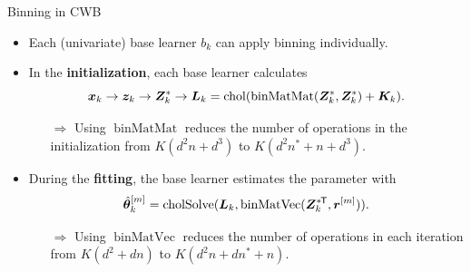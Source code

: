 \documentclass[t,10pt]{beamer}
\newcommand{\todo}{{\color{red}\textbf{TODO:}}\hspace{0.1cm}}
\newcommand{\penMat}{\bm{K}}
\begin{document}

\begin{frame}{Binning in CWB}
  \begin{itemize}
      \item 
        Each (univariate) base learner $b_k$ can apply binning individually.
      
      \item 
        In the \textbf{initialization}, each base learner calculates \[\xv_k \rightarrow \bm{z}_k \rightarrow \bm{Z}_k^\ast \rightarrow \bm{L}_k = \operatorname{chol}(\operatorname{binMatMat}(\design^{\ast}_k, \design^\ast_k) + \penMat_k).\]\vspace{-0.5cm}
        \begin{itemize}
            \item[$\Rightarrow$] Using $\operatorname{binMatMat}$ reduces the number of operations in the initialization from $K(d^2n + d^3)$ to $K(d^2n^\ast + n + d^3)$. 
        \end{itemize}\vspace{0.2cm}
      
      \item 
        During the \textbf{fitting}, the base learner estimates the parameter with \[\hat{\bm{\theta}}^{[m]}_k = \operatorname{cholSolve}(\bm{L}_k, \operatorname{binMatVec}(\bm{Z}^{\ast{\mkern-1.5mu\mathsf{T}}}_k, \bm{r}^{[m]})).\]\vspace{-0.5cm}
        \begin{itemize}
            \item[$\Rightarrow$] Using $\operatorname{binMatVec}$ reduces the number of operations in each iteration from $K(d^2 + dn)$ to $K(d^2n + dn^\ast + n)$. 
        \end{itemize}
  \end{itemize}
\end{frame}
\end{document}
